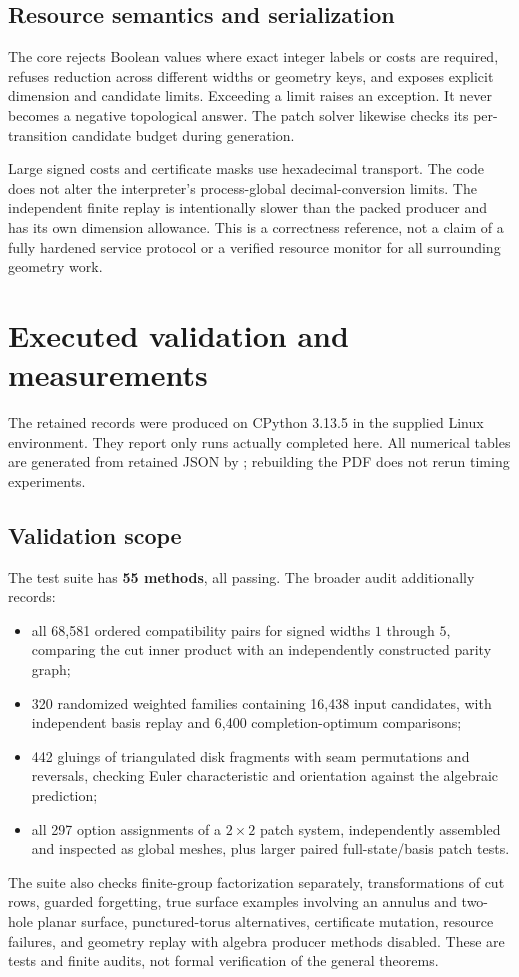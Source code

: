 \documentclass[11pt,letterpaper]{article}
\theoremstyle{definition}
\begin{document}
\subsection{Resource semantics and serialization}
The core rejects Boolean values where exact integer labels or costs are required, refuses reduction across different widths or geometry keys, and exposes explicit dimension and candidate limits. Exceeding a limit raises an exception. It never becomes a negative topological answer. The patch solver likewise checks its per-transition candidate budget during generation.

Large signed costs and certificate masks use hexadecimal transport. The code does not alter the interpreter's process-global decimal-conversion limits. The independent finite replay is intentionally slower than the packed producer and has its own dimension allowance. This is a correctness reference, not a claim of a fully hardened service protocol or a verified resource monitor for all surrounding geometry work.

\section{Executed validation and measurements}
\label{sec:validation}
The retained records were produced on CPython 3.13.5 in the supplied Linux environment. They report only runs actually completed here. All numerical tables are generated from retained JSON by ; rebuilding the PDF does not rerun timing experiments.

\subsection{Validation scope}
The test suite has \textbf{55 methods}, all passing. The broader audit additionally records:
\begin{itemize}
\item all 68,581 ordered compatibility pairs for signed widths $1$ through $5$, comparing the cut inner product with an independently constructed parity graph;
\item 320 randomized weighted families containing 16,438 input candidates, with independent basis replay and 6,400 completion-optimum comparisons;
\item 442 gluings of triangulated disk fragments with seam permutations and reversals, checking Euler characteristic and orientation against the algebraic prediction;
\item all 297 option assignments of a $2\times2$ patch system, independently assembled and inspected as global meshes, plus larger paired full-state/basis patch tests.
\end{itemize}
The suite also checks finite-group factorization separately, transformations of cut rows, guarded forgetting, true surface examples involving an annulus and two-hole planar surface, punctured-torus alternatives, certificate mutation, resource failures, and geometry replay with algebra producer methods disabled. These are tests and finite audits, not formal verification of the general theorems.
\end{document}
